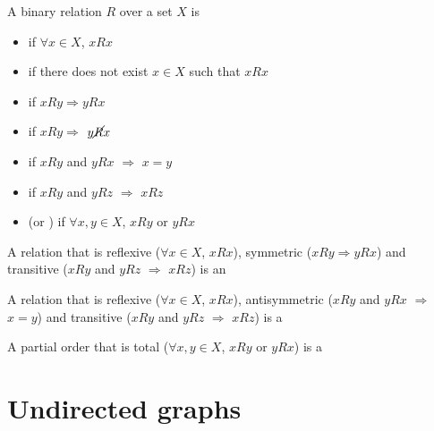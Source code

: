 \documentclass[aspectratio=169]{beamer}\usepackage[]{graphicx}\usepackage[]{xcolor}
\begin{document}
\begin{frame}
	\begin{definition}
		A binary relation $R$ over a set $X$ is
	\begin{itemize}
	\item {} if $\forall x\in X$, $xRx$
	\item {} if there does not exist $x\in X$ such that $xRx$
	\item {} if $xRy \Rightarrow yRx$
	\item {} if $xRy \Rightarrow $ $y\cancel R x$
	\item {} if $xRy$ and $yRx$ $\Rightarrow$ $x=y$
	\item {} if $xRy$ and $yRz$ $\Rightarrow$  $xRz$
	\item {} (or ) if $\forall x, y\in X$, $x R y$ or $y R x$
	\end{itemize}
	\end{definition}
\end{frame}
	
	
\begin{frame} 
	\begin{definition}
	 A relation that is reflexive ($\forall x\in X$, $xRx$), symmetric ($xRy \Rightarrow yRx$) and transitive ($xRy$ and $yRz$ $\Rightarrow$  $xRz$) is an 
	\end{definition}
	\vfill
	\begin{minordefinition}
	 A relation that is reflexive ($\forall x\in X$, $xRx$), antisymmetric ($xRy$ and $yRx$ $\Rightarrow$ $x=y$) and transitive ($xRy$ and $yRz$ $\Rightarrow$  $xRz$) is a 
	\end{minordefinition}
	\vfill
	\begin{minordefinition}
	A partial order that is total ($\forall x, y\in X$, $x R y$ or $y R x$) is a 
	\end{minordefinition}
\end{frame}
	



\section{Undirected graphs}
\end{document}
